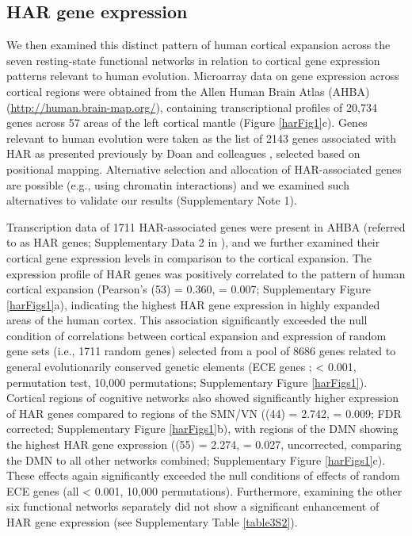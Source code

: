 \begin{refsection}
\subsection*{HAR gene expression}
We then examined this distinct pattern of human cortical expansion across the seven resting-state functional networks in relation to cortical gene expression patterns relevant to human evolution. Microarray data on gene expression across cortical regions were obtained from the Allen Human Brain Atlas (AHBA) (\url{http://human.brain-map.org/}), containing transcriptional profiles of 20,734 genes across 57 areas of the left cortical mantle (Figure \ref{harFig1}c). Genes relevant to human evolution were taken as the list of 2143 genes associated with HAR as presented previously by Doan and colleagues \citep{doan2016mutations}, selected based on positional mapping. Alternative selection and allocation of HAR-associated genes are possible (e.g., using chromatin interactions) and we examined such alternatives to validate our results (Supplementary Note 1).

Transcription data of 1711 HAR-associated genes were present in AHBA (referred to as HAR genes; Supplementary Data 2 in \citep{Wei2019GeneticMA}), and we further examined their cortical gene expression levels in comparison to the cortical expansion. The expression profile of HAR genes was positively correlated to the pattern of human cortical expansion (Pearson's \rvaldf(53) = 0.360, \pval = 0.007; Supplementary Figure \ref{harFigs1}a), indicating the highest HAR gene expression in highly expanded areas of the human cortex. This association significantly exceeded the null condition of correlations between cortical expansion and expression of random gene sets (i.e., 1711 random genes) selected from a pool of 8686 genes related to general evolutionarily conserved genetic elements (ECE genes \citep{lindblad2011high}; \pval < 0.001, permutation test, 10,000 permutations; Supplementary Figure \ref{harFigs1}). Cortical regions of cognitive networks also showed significantly higher expression of HAR genes compared to regions of the SMN/VN (\tvaldf(44) = 2.742, \pval = 0.009; FDR corrected; Supplementary Figure \ref{harFigs1}b), with regions of the DMN showing the highest HAR gene expression (\tvaldf(55) = 2.274, \pval = 0.027, uncorrected, comparing the DMN to all other networks combined; Supplementary Figure \ref{harFigs1}c). These effects again significantly exceeded the null conditions of effects of random ECE genes (all \pval < 0.001, 10,000 permutations). Furthermore, examining the other six functional networks separately did not show a significant enhancement of HAR gene expression (see Supplementary Table \ref{table3S2}).


\end{refsection}
